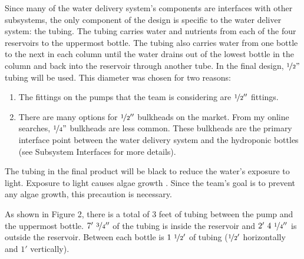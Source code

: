 \documentclass[12pt]{article}
\begin{document}
Since many of the water delivery system's components are interfaces with other subsystems, the only
component of the design is specific to the water deliver system: the tubing. The tubing carries
water and nutrients from each of the four reservoirs to the uppermost bottle. The tubing also
carries water from one bottle to the next in each column until the water drains out of the lowest
bottle in the column and back into the reservoir through another tube. In the final design,
$\nicefrac{1}{2}"$ tubing will be used. This diameter was chosen for two reasons:

\begin{enumerate}

    \item The fittings on the pumps that the team is considering are $\nicefrac{1}{2}''$ fittings.

    \item There are many options for $\nicefrac{1}{2}''$ bulkheads on the market. From my online
        searches, $\nicefrac{1}{4}"$ bulkheads are less common. These bulkheads are the primary
        interface point between the water delivery system and the hydroponic bottles (see Subsystem
        Interfaces for more details).

\end{enumerate}


The tubing in the final product will be black to reduce the water's exposure to light. Exposure to
light causes algae growth \cite{doe-washington}. Since the team's goal is to prevent any algae
growth, this precaution is necessary.

As shown in Figure 2, there is a total of 3 feet of tubing between the pump and the uppermost
bottle. $7'\ \nicefrac{3}{4}''$ of the tubing is inside the reservoir and $2'\ 4\ \nicefrac{1}{4}''$
is outside the reservoir. Between each bottle is $1\ \nicefrac{1}{2}'$ of tubing ($\nicefrac{1}{2}'$
horizontally and $1'$ vertically).
\end{document}
